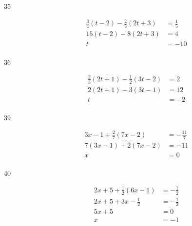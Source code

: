 \documentclass[letterpaper]{exam}
\begin{document}
\begin{description}
      \item[35]
        \begin{align*}
          \frac{3}{4}(t - 2) - \frac{2}{5}(2t + 3) & = \frac{1}{5} \\
          15(t - 2) - 8(2t + 3)                    & = 4 \\
          t                                        & = \boxed{ -10 } \\
        \end{align*}

      \item[36] 
        \begin{align*}
          \frac{2}{3} (2t + 1) - \frac{1}{2} (3t - 2) & = 2 \\
          2(2t + 1) - 3(3t - 1)                       & = 12 \\
          t                                           & = \boxed{ -2 } \\
        \end{align*}


      \item[39]
        \begin{align*}
          3x - 1 + \frac{2}{7}(7x - 2) & = - \frac{11}{7} \\
          7(3x - 1) + 2(7x - 2)        & = -11 \\
          x                            & = \boxed{ 0 } \\
        \end{align*}

      \item[40]
        \begin{align*}
          2x + 5 + \frac{1}{2}(6x - 1) & = -\frac{1}{2} \\
          2x + 5 + 3x - \frac{1}{2}    & = -\frac{1}{2} \\
          5x + 5                       & = 0 \\
          x                            & = \boxed{ -1 } \\
        \end{align*}


\end{description}
\end{document}
